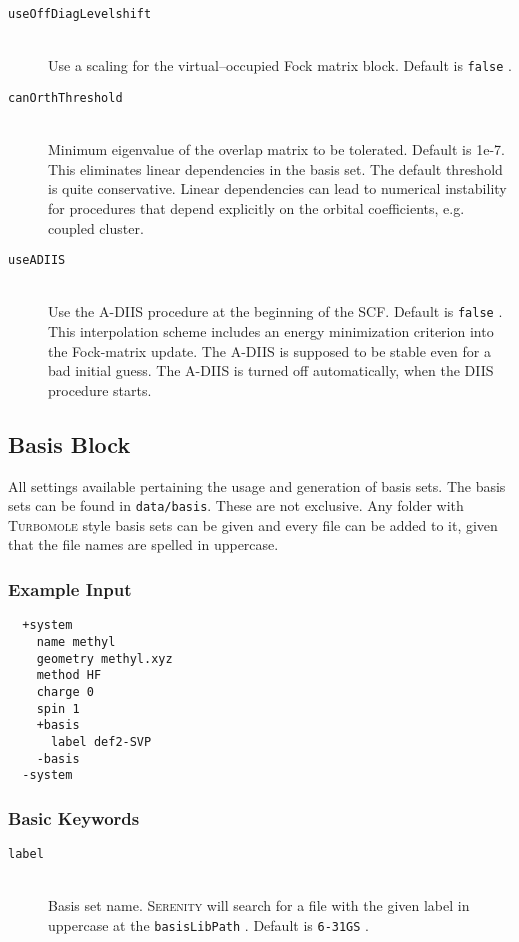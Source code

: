 \documentclass[bibliography=totocnumbered,a4paper,10pt,oneside]{scrbook}
\newcommand{
\serenity}{\textsc{Serenity}\xspace}
\newcommand{\ttt}[1]{%
  \begingroup\setlength{\fboxsep}{1pt}%
  \colorbox{serenity-green!30}{\texttt{\hspace*{2pt}\vphantom{(g}#1\hspace*{2pt}}}%
  \endgroup
}
\begin{document}
\begin{description}
    \item [\texttt{useOffDiagLevelshift}]\hfill \\
    Use a scaling for the virtual--occupied Fock matrix block. Default is \ttt{false}.
    \item [\texttt{canOrthThreshold}]\hfill \\
    Minimum eigenvalue of the overlap matrix to be tolerated. Default is 1e-7. This eliminates linear dependencies
    in the basis set. The default threshold is quite conservative. Linear dependencies can lead to numerical instability
    for procedures that depend explicitly on the orbital coefficients, e.g. coupled cluster.
    \item [\texttt{useADIIS}]\hfill \\
    Use the A-DIIS\cite{hu2010} procedure at the beginning of the SCF. Default is \ttt{false}. This interpolation scheme
    includes an energy minimization criterion into the Fock-matrix update. The A-DIIS is supposed to be stable even for a
    bad initial guess. The A-DIIS is turned off automatically, when the DIIS procedure starts.
 \end{description}

\subsection{Basis Block}\label{sec:system:basis}
All settings available pertaining the usage and generation of basis sets.
The basis sets can be found in \texttt{data/basis}. These are not exclusive. Any folder with \textsc{Turbomole}
style basis sets can be given and every file can be added to it, given that the file names are spelled in
uppercase.

\subsubsection{Example Input}
\begin{lstlisting}
  +system
    name methyl
    geometry methyl.xyz
    method HF
    charge 0
    spin 1
    +basis
      label def2-SVP
    -basis
  -system
 \end{lstlisting}
\subsubsection{Basic Keywords}
\begin{description}
 \item [\texttt{label}]\hfill \\
 Basis set name. \serenity will search for a file with the given label in uppercase at the \ttt{basisLibPath}. Default is \ttt{6-31GS}.

\end{description}
\end{document}
